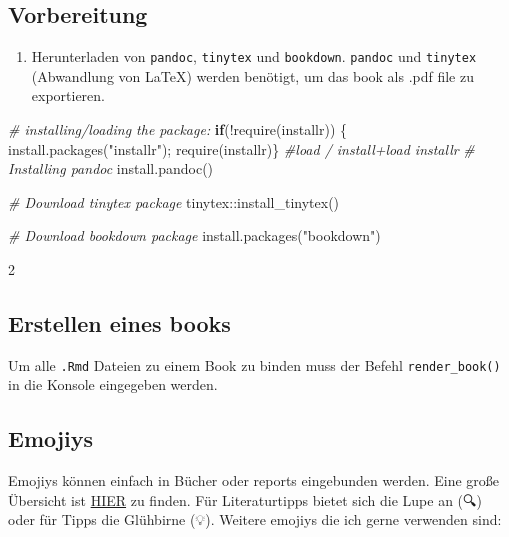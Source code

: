 \documentclass[
]{article}
\newenvironment{Shaded}{\begin{snugshade}}{\end{snugshade}}
\newcommand{\CommentTok}[1]{\textcolor[rgb]{0.56,0.35,0.01}{\textit{#1}}}
\newcommand{\ControlFlowTok}[1]{\textcolor[rgb]{0.13,0.29,0.53}{\textbf{#1}}}
\newcommand{\FunctionTok}[1]{\textcolor[rgb]{0.00,0.00,0.00}{#1}}
\newcommand{\NormalTok}[1]{#1}
\newcommand{\SpecialCharTok}[1]{\textcolor[rgb]{0.00,0.00,0.00}{#1}}
\newcommand{\StringTok}[1]{\textcolor[rgb]{0.31,0.60,0.02}{#1}}
\providecommand{\tightlist}{%
  \setlength{\itemsep}{0pt}\setlength{\parskip}{0pt}}
\begin{document}
\hypertarget{vorbereitung}{%
\subsection{Vorbereitung}\label{vorbereitung}}

\begin{enumerate}
\def\labelenumi{\arabic{enumi}.}
\tightlist
\item
  Herunterladen von \texttt{pandoc}, \texttt{tinytex} und \texttt{bookdown}. \texttt{pandoc} und \texttt{tinytex} (Abwandlung von LaTeX) werden benötigt, um das book als .pdf file zu exportieren.
\end{enumerate}

\begin{Shaded}
\begin{Highlighting}[]
\CommentTok{\# installing/loading the package:}
\ControlFlowTok{if}\NormalTok{(}\SpecialCharTok{!}\FunctionTok{require}\NormalTok{(installr)) \{ }\FunctionTok{install.packages}\NormalTok{(}\StringTok{"installr"}\NormalTok{); }\FunctionTok{require}\NormalTok{(installr)\} }\CommentTok{\#load / install+load installr}
\CommentTok{\# Installing pandoc}
\FunctionTok{install.pandoc}\NormalTok{()}

\CommentTok{\# Download tinytex package}
\NormalTok{tinytex}\SpecialCharTok{::}\FunctionTok{install\_tinytex}\NormalTok{()}

\CommentTok{\# Download bookdown package}
\FunctionTok{install.packages}\NormalTok{(}\StringTok{"bookdown"}\NormalTok{)}
\end{Highlighting}
\end{Shaded}

2

\hypertarget{erstellen-eines-books}{%
\subsection{Erstellen eines books}\label{erstellen-eines-books}}

Um alle \texttt{.Rmd} Dateien zu einem Book zu binden muss der Befehl \texttt{render\_book()} in die Konsole eingegeben werden.

\hypertarget{emojiys}{%
\subsection{Emojiys}\label{emojiys}}

Emojiys können einfach in Bücher oder reports eingebunden werden. Eine große Übersicht ist \href{https://github.com/hadley/emo}{HIER} zu finden. Für Literaturtipps bietet sich die Lupe an (🔍) oder für Tipps die Glühbirne (💡). Weitere emojiys die ich gerne verwenden sind:
\end{document}
